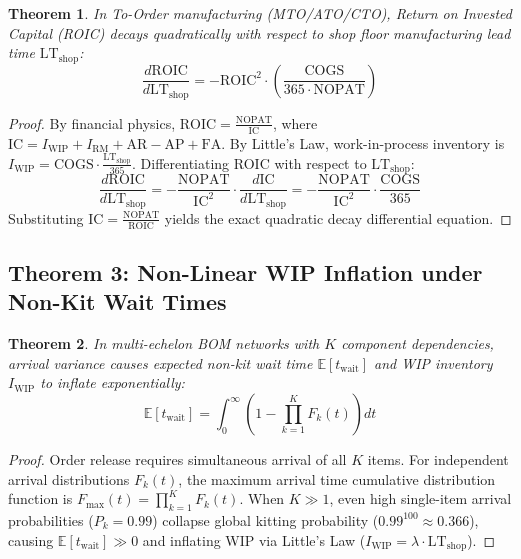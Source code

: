 \documentclass[11pt,a4paper]{article}
\newtheorem{theorem}{Theorem}[section]
\begin{document}
\begin{theorem}
In To-Order manufacturing (MTO/ATO/CTO), Return on Invested Capital (ROIC) decays quadratically with respect to shop floor manufacturing lead time $\text{LT}_{\mathrm{shop}}$:
\begin{equation}
    \frac{d\text{ROIC}}{d\text{LT}_{\mathrm{shop}}} = - \text{ROIC}^2 \cdot \left( \frac{\text{COGS}}{365 \cdot \text{NOPAT}} \right)
\end{equation}
\end{theorem}

\begin{proof}
By financial physics, $\text{ROIC} = \frac{\text{NOPAT}}{\text{IC}}$, where $\text{IC} = I_{\text{WIP}} + I_{\text{RM}} + \text{AR} - \text{AP} + \text{FA}$. By Little's Law, work-in-process inventory is $I_{\text{WIP}} = \text{COGS} \cdot \frac{\text{LT}_{\text{shop}}}{365}$. Differentiating ROIC with respect to $\text{LT}_{\text{shop}}$:
\begin{equation}
    \frac{d\text{ROIC}}{d\text{LT}_{\text{shop}}} = - \frac{\text{NOPAT}}{\text{IC}^2} \cdot \frac{d\text{IC}}{d\text{LT}_{\text{shop}}} = - \frac{\text{NOPAT}}{\text{IC}^2} \cdot \frac{\text{COGS}}{365}
\end{equation}
Substituting $\text{IC} = \frac{\text{NOPAT}}{\text{ROIC}}$ yields the exact quadratic decay differential equation.
\end{proof}

\subsection{Theorem 3: Non-Linear WIP Inflation under Non-Kit Wait Times}

\begin{theorem}
In multi-echelon BOM networks with $K$ component dependencies, arrival variance causes expected non-kit wait time $\mathbb{E}[t_{\mathrm{wait}}]$ and WIP inventory $I_{\mathrm{WIP}}$ to inflate exponentially:
\begin{equation}
    \mathbb{E}[t_{\mathrm{wait}}] = \int_0^{\infty} \left( 1 - \prod_{k=1}^K F_k(t) \right) dt
\end{equation}
\end{theorem}

\begin{proof}
Order release requires simultaneous arrival of all $K$ items. For independent arrival distributions $F_k(t)$, the maximum arrival time cumulative distribution function is $F_{\max}(t) = \prod_{k=1}^K F_k(t)$. When $K \gg 1$, even high single-item arrival probabilities ($P_k = 0.99$) collapse global kitting probability ($0.99^{100} \approx 0.366$), causing $\mathbb{E}[t_{\mathrm{wait}}] \gg 0$ and inflating WIP via Little's Law ($I_{\text{WIP}} = \lambda \cdot \text{LT}_{\text{shop}}$).
\end{proof}
\end{document}
